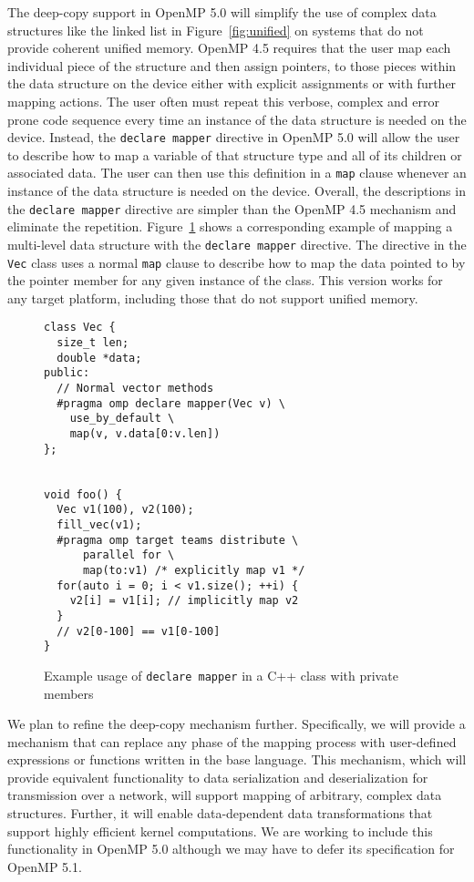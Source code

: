 The deep-copy support in OpenMP 5.0 will simplify the use of complex data
structures like the linked list in Figure~\ref{fig:unified} on systems that 
do not provide coherent unified memory. OpenMP 4.5 requires that the user map 
each individual piece of the structure and then assign pointers, to those 
pieces within the data structure on the device either with explicit 
assignments or with further mapping actions. The user often must repeat this 
verbose, complex and error prone code sequence every time an instance of the 
data structure is needed on the device. Instead, the \texttt{declare mapper}
directive in OpenMP 5.0 will allow the user to describe how to map a variable 
of that structure type and all of its children or associated data. The user
can then use this definition in a \texttt{map} clause whenever an instance 
of the data structure is needed on the device. Overall, the descriptions in
the \texttt{declare mapper} directive are simpler than the OpenMP 4.5
mechanism and eliminate the repetition. Figure~\ref{fig:mapper} shows a
corresponding example of mapping a multi-level data structure with the
\texttt{declare mapper} directive.  The directive in the \texttt{Vec} class uses
a normal \texttt{map} clause to describe how to map the data pointed to by the
pointer member for any given instance of the class.  This version works for any
target platform, including those that do not support unified memory.

\begin{figure}
\begin{verbatim}
class Vec {
  size_t len;
  double *data;
public:
  // Normal vector methods
  #pragma omp declare mapper(Vec v) \
    use_by_default \
    map(v, v.data[0:v.len])
};


void foo() {
  Vec v1(100), v2(100);
  fill_vec(v1);
  #pragma omp target teams distribute \
      parallel for \
      map(to:v1) /* explicitly map v1 */
  for(auto i = 0; i < v1.size(); ++i) { 
    v2[i] = v1[i]; // implicitly map v2
  }
  // v2[0-100] == v1[0-100]
}
\end{verbatim}
\caption{Example usage of \texttt{declare mapper} in a C++ class with private
members}
\label{fig:mapper}
\end{figure}

We plan to refine the deep-copy mechanism further. Specifically, we will 
provide a mechanism that can replace any phase of the mapping process with 
user-defined expressions or functions written in the base language. This 
mechanism, which will provide equivalent functionality to data  serialization 
and deserialization for transmission over a network,  will support mapping 
of arbitrary, complex data structures. Further, it will enable data-dependent 
data transformations that support highly efficient kernel computations. We
are working to include this functionality in OpenMP 5.0 although we may
have to defer its specification for OpenMP 5.1.




